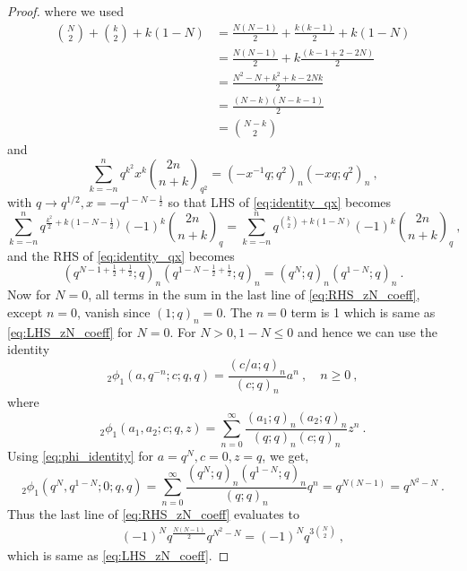 \documentclass[a4paper,10pt]{article}
\begin{document}
\begin{proof}
where we used
\begin{equation}
\begin{aligned}
\binom{N}{2}+\binom{k}{2}+k(1-N) & =\frac{N(N-1)}{2}+\frac{k(k-1)}{2}+k(1-N) \\
& =\frac{N(N-1)}{2}+k \frac{(k-1+2-2 N)}{2} \\
& =\frac{N^2-N+k^2+k-2 N k}{2} \\
& =\frac{(N-k)(N-k-1)}{2} \\
& =\binom{N-k}{2}
\end{aligned}
\end{equation}
and \cite[Page 49, Example 1]{andrews1998theory}
\begin{equation}\label{eq:identity_qx}
\sum_{k=-n}^n q^{k^2} x^k{
2 n \choose
n+k}_{q^2}=\left(-x^{-1} q ; q^2\right)_n\left(-x q ; q^2\right)_n~,
\end{equation}
with $q \rightarrow q^{1 / 2}, x=-q^{1-N-\frac{1}{2}}$ so that LHS of \eqref{eq:identity_qx} becomes
\begin{equation}
\sum_{k=-n}^n q^{\frac{k^2}{2}+k\left(1-N-\frac{1}{2}\right)}(-1)^k{
2 n \choose
n+k}_q=\sum_{k=-n}^n q^{\binom{k}{2}+k(1-N)}(-1)^k{
2 n \choose
n+k}_q~,
\end{equation}
and the RHS of \eqref{eq:identity_qx} becomes
\begin{equation}
\left(q^{N-1+\frac{1}{2}+\frac{1}{2}} ; q\right)_n\left(q^{1-N-\frac{1}{2}+\frac{1}{2}} ; q\right)_n=\left(q^N ; q\right)_n\left(q^{1-N} ; q\right)_n~.
\end{equation}
Now for $N=0$, all terms in the sum in the last line of \eqref{eq:RHS_zN_coeff}, except $n=0$, vanish since $(1 ; q)_n=0$. The $n=0$ term is 1 which is same as \eqref{eq:LHS_zN_coeff} for $N=0$.
For $N>0,1-N \leq 0$ and hence we can use the identity \cite[Appendix II, Eq. (II.6)]{gasper2004basic}
\begin{equation}\label{eq:phi_identity}
{ }_2 \phi_1\left(a, q^{-n} ; c ; q, q\right)=\frac{(c / a ; q)_n}{(c ; q)_n} a^n~,\quad n\geq 0~,
\end{equation}
where \cite[Chapter 1, Eq.(1.2.22)]{gasper2004basic}
\begin{equation}
{ }_2 \phi_1\left(a_1, a_2 ; c ; q, z\right)=\sum_{n=0}^{\infty} \frac{\left(a_1 ; q\right)_n\left(a_2 ; q\right)_n}{(q ; q)_n(c ; q)_n} z^n~.
\end{equation}
Using \eqref{eq:phi_identity} for $a=q^N, c=0,z=q$, we get,
\begin{equation}\label{eq:S_1_sum}
{ }_2 \phi_1\left(q^N, q^{1-N} ; 0 ; q , q\right)=\sum_{n=0}^{\infty} \frac{\left(q^N ; q\right)_n\left(q^{1-N} ; q\right)_n}{(q ; q)_n} q^n=q^{N(N-1)}=q^{N^2-N}~.
\end{equation}
Thus the last line of \eqref{eq:RHS_zN_coeff} evaluates to
\begin{align}
(-1)^N q^{\frac{N(N-1)}{2}} q^{N^2-N}=(-1)^N q^{3\binom{N}{2}}~,
\end{align}
which is same as \eqref{eq:LHS_zN_coeff}.
\end{proof}
\end{document}

